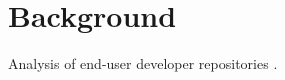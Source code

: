 \section{Background}

Analysis of end-user developer repositories
\cite{athreya2012:touchdevelop,bogart2008:coscripter,sihan2013:touchdevelop,stolee2013:yahoopipes}.
\cite{brandt2009two}